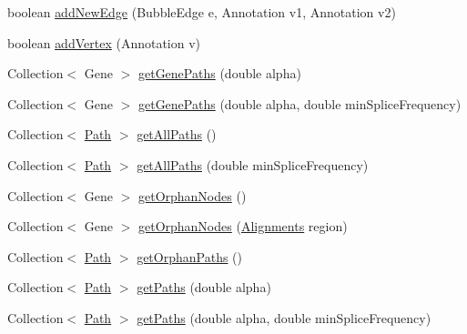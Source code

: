 \begin{DoxyCompactItemize}
\item 
boolean \hyperlink{classbroad_1_1pda_1_1seq_1_1graph_1_1_chromosome_with_bubbles_j_graph_t_a43d023ca377566d0b81c87ccbb39f3a5}{add\+New\+Edge} (Bubble\+Edge e, Annotation v1, Annotation v2)
\item 
boolean \hyperlink{classbroad_1_1pda_1_1seq_1_1graph_1_1_chromosome_with_bubbles_j_graph_t_a2812dbd00d83fed8abb63aa99abe0b77}{add\+Vertex} (Annotation v)
\item 
Collection$<$ Gene $>$ \hyperlink{classbroad_1_1pda_1_1seq_1_1graph_1_1_chromosome_with_bubbles_j_graph_t_a7466db78d94e9436f2a4850a32435de2}{get\+Gene\+Paths} (double alpha)
\item 
Collection$<$ Gene $>$ \hyperlink{classbroad_1_1pda_1_1seq_1_1graph_1_1_chromosome_with_bubbles_j_graph_t_a9d2556505217ab0b453f84da0153fca4}{get\+Gene\+Paths} (double alpha, double min\+Splice\+Frequency)
\item 
Collection$<$ \hyperlink{classbroad_1_1pda_1_1seq_1_1graph_1_1_path}{Path} $>$ \hyperlink{classbroad_1_1pda_1_1seq_1_1graph_1_1_chromosome_with_bubbles_j_graph_t_a38e4b4f6ca631176279b4718e960af5b}{get\+All\+Paths} ()
\item 
Collection$<$ \hyperlink{classbroad_1_1pda_1_1seq_1_1graph_1_1_path}{Path} $>$ \hyperlink{classbroad_1_1pda_1_1seq_1_1graph_1_1_chromosome_with_bubbles_j_graph_t_a3cc78f0b8d52ca70104190effddf8ba1}{get\+All\+Paths} (double min\+Splice\+Frequency)
\item 
Collection$<$ Gene $>$ \hyperlink{classbroad_1_1pda_1_1seq_1_1graph_1_1_chromosome_with_bubbles_j_graph_t_a971a1afc17edfd3822cf93cb00011161}{get\+Orphan\+Nodes} ()
\item 
Collection$<$ Gene $>$ \hyperlink{classbroad_1_1pda_1_1seq_1_1graph_1_1_chromosome_with_bubbles_j_graph_t_a5458052a44ce572c566c5a8425860a80}{get\+Orphan\+Nodes} (\hyperlink{classbroad_1_1pda_1_1datastructures_1_1_alignments}{Alignments} region)
\item 
Collection$<$ \hyperlink{classbroad_1_1pda_1_1seq_1_1graph_1_1_path}{Path} $>$ \hyperlink{classbroad_1_1pda_1_1seq_1_1graph_1_1_chromosome_with_bubbles_j_graph_t_abfc48453fd3cd296b35eebd812cf471e}{get\+Orphan\+Paths} ()
\item 
Collection$<$ \hyperlink{classbroad_1_1pda_1_1seq_1_1graph_1_1_path}{Path} $>$ \hyperlink{classbroad_1_1pda_1_1seq_1_1graph_1_1_chromosome_with_bubbles_j_graph_t_a036fbb7575abb0eb4b267eb94e352a93}{get\+Paths} (double alpha)
\item 
Collection$<$ \hyperlink{classbroad_1_1pda_1_1seq_1_1graph_1_1_path}{Path} $>$ \hyperlink{classbroad_1_1pda_1_1seq_1_1graph_1_1_chromosome_with_bubbles_j_graph_t_ab63a00a2c99d961006c1aa684c9ff508}{get\+Paths} (double alpha, double min\+Splice\+Frequency)

\end{DoxyCompactItemize}

